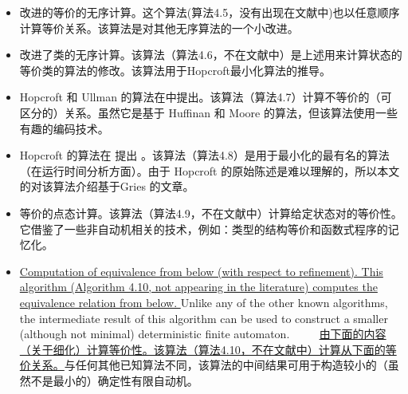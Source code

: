 \begin{itemize}

    \item 改进的等价的无序计算。这个算法(算法4.5，没有出现在文献中)也以任意顺序计算等价关系。该算法是对其他无序算法的一个小改进。

    \item 改进了类的无序计算。该算法（算法4.6，不在文献中）是上述用来计算状态的等价类的算法的修改。该算法用于Hopcroft最小化算法的推导。

    \item Hopcroft 和 Ullman 的算法在\cite{Hu79}中提出。该算法（算法4.7）计算不等价的（可区分的）关系。虽然它是基于 Huffinan \cite{Huff54}和 Moore \cite{Moor56} 的算法，但该算法使用一些有趣的编码技术。

    \item Hopcroft 的算法在 \cite{Hopc71, Grie73} 提出 。该算法（算法4.8）是用于最小化的最有名的算法（在运行时间分析方面）。由于 Hopcroft 的原始陈述是难以理解的，所以本文的对该算法介绍基于Gries 的文章。

    \item 等价的点态计算。该算法（算法4.9，不在文献中）计算给定状态对的等价性。它借鉴了一些非自动机相关的技术，例如：类型的结构等价和函数式程序的记忆化。

    \item \uline{Computation of equivalence from below (with respect to refinement). This algorithm (Algorithm 4.10, not appearing in the literature) computes the equivalence relation from below. } Unlike any of the other known algorithms, the intermediate result of this algorithm can be used to construct a smaller (although not minimal) deterministic finite automaton.
　　\newline
    \uline{由下面的内容（关于细化）计算等价性。该算法（算法4.10，不在文献中）计算从下面的等价关系。}与任何其他已知算法不同，该算法的中间结果可用于构造较小的（虽然不是最小的）确定性有限自动机。

\end{itemize}